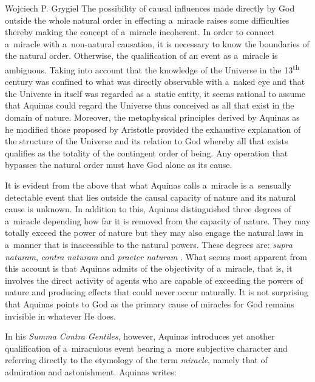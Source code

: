 \begin{artengenv}{Wojciech P. Grygiel}
{}
The possibility of causal influences made directly by God outside the whole natural order in effecting a~miracle raises some difficulties thereby making the concept of a~miracle incoherent. In order to connect a~miracle with a~non-natural causation, it is necessary to know the boundaries of the natural order. Otherwise, the qualification of an event as a~miracle is ambiguous. Taking into account that the knowledge of the Universe in the 13\textsuperscript{th} century was confined to what was directly observable with a~naked eye and that the Universe in itself was regarded as a~static entity, it seems rational to assume that Aquinas could regard the Universe thus conceived as all that exist in the domain of nature. Moreover, the metaphysical principles derived by Aquinas as he modified those proposed by Aristotle provided the exhaustive explanation of the structure of the Universe and its relation to God whereby all that exists qualifies as the totality of the contingent order of being. Any operation that bypasses the natural order must have God alone as its cause.

It is evident from the above that what Aquinas calls a~miracle is a~sensually detectable event that lies outside the causal capacity of nature and its natural cause is unknown. In addition to this, Aquinas distinguished three degrees of a~miracle depending how far it is removed from the capacity of nature. They may totally exceed the power of nature but they may also engage the natural laws in a~manner that is inaccessible to the natural powers. These degrees are: \textit{supra naturam}, \textit{contra naturam} and \textit{praeter naturam}
\parencite[][]{aquinas_power_1952}. %
 What seems most apparent from this account is that Aquinas admits of the objectivity of a~miracle, that is, it involves the direct activity of agents who are capable of exceeding the powers of nature and producing effects that could never occur naturally. It is not surprising that Aquinas points to God as the primary cause of miracles for God remains invisible in whatever He does.

In his \textit{Summa Contra Gentiles}, however, Aquinas introduces yet another qualification of a~miraculous event bearing a~more subjective character and referring directly to the etymology of the term \textit{miracle}, namely that of admiration and astonishment. Aquinas writes:


\end{artengenv}
